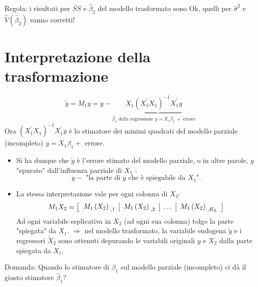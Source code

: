 \documentclass[a4paper]{report}
\theoremstyle{remark}
\begin{document}
\noindent Regola: i risultati per $\widetilde{SS}$ e $\widehat{\beta }_{2}$
del modello trasformato sono Ok, quelli per $\widehat{\sigma }^{2}$ e $%
\widehat{V}(\widehat{\beta }_{2})$ vanno corretti!

\section{Interpretazione della trasformazione}

\begin{equation*}
\widetilde{y}=M_{1}y=y-\underset{\widehat{\beta }_{1}\text{ della
regressione }y=X_{1}\beta _{1}\ +\ \text{errore}}{X_{1}\underbrace{\left(
X_{1}^{\prime }X_{1}\right) ^{-1}X_{1}^{\prime }y}}
\end{equation*}%
Ora $\left( X_{1}^{\prime }X_{1}\right) ^{-1}X_{1}^{\prime }y$ \`{e} lo
stimatore dei minimi quadrati del modello parziale (incompleto) $%
y=X_{1}\beta _{1}+$ errore.

\begin{itemize}
\item Si ha dunque che $\widetilde{y}$ \`{e} l'errore stimato del modello
parziale, o in altre parole, $y$ "epurato" dall'influenza parziale di $X_{1}$%
:%
\begin{equation*}
y-\text{ "la parte di }y\text{ che \`{e} spiegabile da }X_{1}\text{".}
\end{equation*}

\item La stessa interpretazione vale per ogni colonna di $X_{2}$:%
\begin{equation*}
M_{1}X_{2}=\left[ 
\begin{tabular}{l|l|l|l}
$M_{1}\left( X_{2}\right) _{\cdot ,1}$ & $M_{1}\left( X_{2}\right) _{\cdot
,2}$ & $\ldots $ & $M_{1}\left( X_{2}\right) _{\cdot ,K_{2}}$%
\end{tabular}%
\right]
\end{equation*}%
Ad ogni variabile esplicativa in $X_{2}$ (ad ogni sua colonna) tolgo la
parte "spiegata" da $X_{1}$. $\Rightarrow $ nel modello trasformato, la
variabile endogena $\widetilde{y}$ e i regressori $\widetilde{X}_{2}$ sono
ottenuti depurando le variabili originali $y$ e $X_{2}$ dalla parte spiegata
da $X_{1}$.
\end{itemize}

\noindent Domanda: Quando lo stimatore di $\beta _{1}$ sul modello parziale
(incompleto) ci d\`{a} il giusto stimatore $\widehat{\beta }_{1}$?

\bigskip
\end{document}
